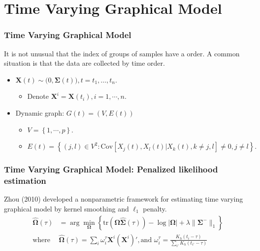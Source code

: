 \documentclass{beamer}
\newcommand{\bX}{\mathbf X}
\newcommand{\bOmega}{{\boldsymbol{\Omega}}}
\newcommand{\bSigma}{{\boldsymbol{\Sigma}}}
\begin{document}
\section{Time Varying Graphical Model}
\begin{frame}

\frametitle{Time Varying Graphical Model}

It is not unusual that the index of groups of samples have a order. A common situation is that the data are collected by time order.

\begin{itemize}
    \item $\bX(t) \sim \mathcal(0, \bSigma(t)), t = t_1, \dots, t_n.$ 
    \begin{itemize}
    	\item Denote $\bX^i = \bX(t_i), i = 1, \cdots, n$.
    \end{itemize}
    \item Dynamic graph: $G(t) = (V, E(t))$
    \begin{itemize}
    	\item $V = \left\{1,\cdots, p\right\}$.
    	\item $E(t) = \left\{ (j,l) \in V^2 : \text{Cov} \left[ X_j(t), X_l(t)| X_k(t), k \neq j,l \right] \neq 0, j \neq l \right\}.$
    \end{itemize}
\end{itemize}
\end{frame}



\begin{frame}

\frametitle{Time Varying Graphical Model: Penalized likelihood estimation}

 Zhou (2010) developed a nonparametric framework for estimating time varying graphical model by kernel smoothing and $\ell_1$ penalty. 
\begin{equation}
\label{eq:kernel_likelihood}
\begin{aligned}
\hat{\bOmega}(\tau) &= \arg\min_{\bOmega} \left\{ \text{tr}(\bOmega \hat{\bSigma}(\tau)) - \log|\bOmega| + \lambda\|\bSigma^{-}\|_1 \right\}\\
\text{where }& \hat{\bOmega}(\tau) = \sum_i \omega_i^{\tau} \bX^i (\bX^i)', \text{and }\omega_i^{\tau} = \frac{K_h(t_i - \tau)}{\sum_{i'} K_h(t_{i'}- \tau)} \\
\end{aligned}
\end{equation}

\end{frame}
\end{document}
